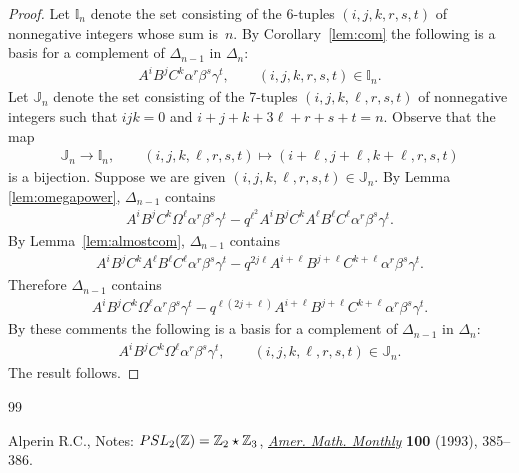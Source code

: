 \documentclass[10pt,a4paper]{amsart}
\begin{document}
\begin{proof}
Let $\mathbb I_n$ denote the set consisting of the 6-tuples
$(i,j,k,r,s,t)$ of nonnegative integers whose sum is~$n$.
By Corollary~\ref{lem:com} the
following
is a basis for a complement of
$\Delta_{n-1}$ in $\Delta_n$:
\begin{gather*}
A^iB^jC^k\alpha^r\beta^s\gamma^t, \qquad
(i,j,k,r,s,t) \in {\mathbb I}_n.
\end{gather*}
Let $\mathbb J_n$ denote the set consisting of the 7-tuples
$(i,j,k,\ell,r,s,t)$ of nonnegative integers such that
$ijk=0$ and
$i+j+k+3\ell+r+s+t = n$.
Observe that the map
\begin{gather*}
\mathbb J_n  \to  \mathbb I_n,
\qquad
(i,j,k,\ell,r,s,t)  \mapsto   (i+\ell,j+\ell,k+\ell,r,s,t)
\end{gather*}
is a bijection.
Suppose we are given $(i,j,k,\ell,r,s,t) \in \mathbb J_n$.
By
Lemma \ref{lem:omegapower},
$\Delta_{n-1}$ contains
\begin{gather*}
A^iB^jC^k\Omega^\ell \alpha^r \beta^s \gamma^t -
q^{\ell^2} A^iB^jC^k A^\ell B^\ell C^\ell \alpha^r \beta^s \gamma^t.
\end{gather*}
By Lemma~\ref{lem:almostcom},  $\Delta_{n-1}$ contains
\begin{gather*}
A^iB^jC^k A^\ell B^\ell C^\ell \alpha^r \beta^s \gamma^t
-
q^{2j \ell} A^{i+\ell}B^{j+\ell}C^{k+\ell}  \alpha^r \beta^s \gamma^t.
\end{gather*}
Therefore $\Delta_{n-1}$ contains
\begin{gather*}
A^iB^jC^k\Omega^\ell \alpha^r \beta^s \gamma^t -
q^{\ell(2j+ \ell)} A^{i+\ell}B^{j+\ell}C^{k+\ell}  \alpha^r \beta^s \gamma^t.
\end{gather*}
By these comments the following is a basis for a complement of
$\Delta_{n-1}$ in $\Delta_n$:
\begin{gather*}
A^iB^jC^k\Omega^\ell \alpha^r\beta^s\gamma^t, \qquad
(i,j,k,\ell,r,s,t) \in \mathbb J_n.
\end{gather*}
The result follows.
\end{proof}

\begin{thebibliography}{99}

\footnotesize\itemsep=0pt
Alperin R.C.,
Notes: ${\rm  {PSL}}_2(\mathbb Z)= \mathbb Z_2 \star \mathbb Z_3$,
\href{http://dx.doi.org/10.2307/2324963}{{\it Amer. Math. Monthly}} {\bf 100} (1993), 385--386.
\end{thebibliography}
\end{document}
